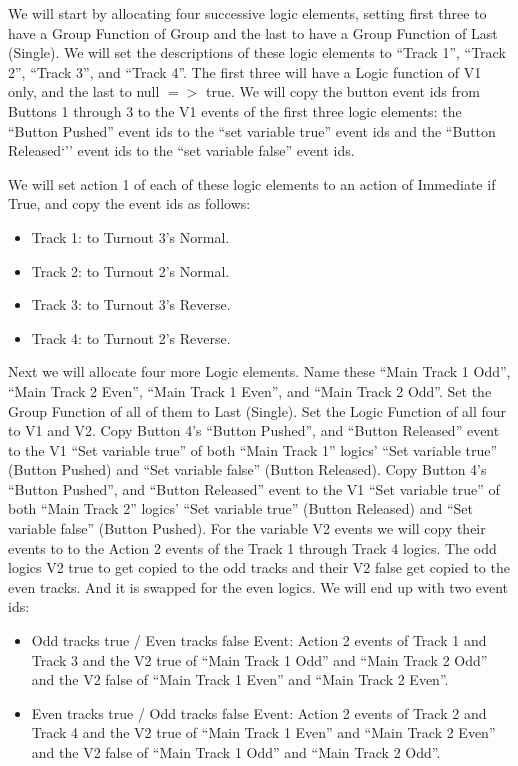 We will start by allocating four successive logic elements, setting first
three to have a Group Function of Group and the last to have a Group Function
of Last (Single). We will set the descriptions of these logic elements to
``Track 1'', ``Track 2'', ``Track 3'', and ``Track 4''. The first three will
have a Logic function of V1 only, and the last to null $=>$ true. We will copy
the button event ids from Buttons 1 through 3 to the V1 events of the first
three logic elements: the ``Button Pushed'' event ids to the ``set variable
true'' event ids and the ``Button Released`'' event ids to the ``set variable
false'' event ids.

We will set action 1 of each of these logic elements to an action of Immediate 
if True, and copy the event ids as follows:

\begin{itemize}
\item Track 1: to Turnout 3's Normal.
\item Track 2: to Turnout 2's Normal.
\item Track 3: to Turnout 3's Reverse.
\item Track 4: to Turnout 2's Reverse.
\end{itemize}

Next we will allocate four more Logic elements. Name these ``Main Track 1
Odd'', ``Main Track 2 Even'', ``Main Track 1 Even'', and ``Main Track 2 Odd''.
Set the Group Function of all of them to Last (Single). Set the Logic Function
of all four to V1 and V2. Copy Button 4's ``Button Pushed'', and ``Button
Released'' event to the V1 ``Set variable true'' of both ``Main Track 1''
logics' ``Set variable true'' (Button Pushed) and ``Set variable false''
(Button Released). Copy Button 4's ``Button Pushed'', and ``Button Released''
event to the V1 ``Set variable true'' of both ``Main Track 2'' logics' ``Set
variable true'' (Button Released) and ``Set variable false'' (Button Pushed).
For the variable V2 events we will copy their events to to the Action 2 events
of the Track 1 through Track 4 logics. The odd logics V2 true to get copied to
the odd tracks and their V2 false get copied to the even tracks. And it is
swapped for the even logics. We will end up with two event ids:

\begin{itemize}
\item Odd tracks true / Even tracks false Event: Action 2 events of Track 1 
and Track 3 and the V2 true of ``Main Track 1 Odd'' and ``Main Track 2 Odd'' 
and the V2 false of ``Main Track 1 Even'' and ``Main Track 2 Even''.
\item Even tracks true / Odd tracks false Event: Action 2 events of Track 2 
and Track 4 and the V2 true of ``Main Track 1 Even'' and ``Main Track 2 Even'' 
and the V2 false of ``Main Track 1 Odd'' and ``Main Track 2 Odd''.
\end{itemize}


